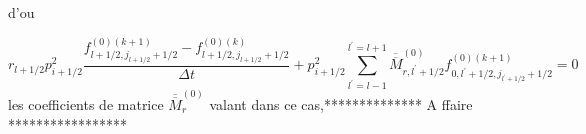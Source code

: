 d'ou

\[
r_{l+1/2}p_{i+1/2}^{2}\frac{f_{l+1/2,j_{l+1/2}+1/2}^{\left(0\right)(k+1)}-f_{l+1/2,j_{l+1/2}+1/2}^{\left(0\right)\left(k\right)}}{\Delta t}+p_{i+1/2}^{2}\sum_{l^{\prime}=l-1}^{l^{\prime}=l+1}\overline{\overline{M}}_{r,l^{\prime}+1/2}^{\left(0\right)}f_{0,l^{\prime}+1/2,j_{l^{\prime}+1/2}+1/2}^{\left(0\right)(k+1)}=0\]
 les coefficients de matrice $\overline{\overline{M}}_{r}^{\left(0\right)}$
valant dans ce cas,{*}{*}{*}{*}{*}{*}{*}{*}{*}{*}{*}{*}{*}{*} A ffaire
{*}{*}{*}{*}{*}{*}{*}{*}{*}{*}{*}{*}{*}{*}{*}{*}{*}
